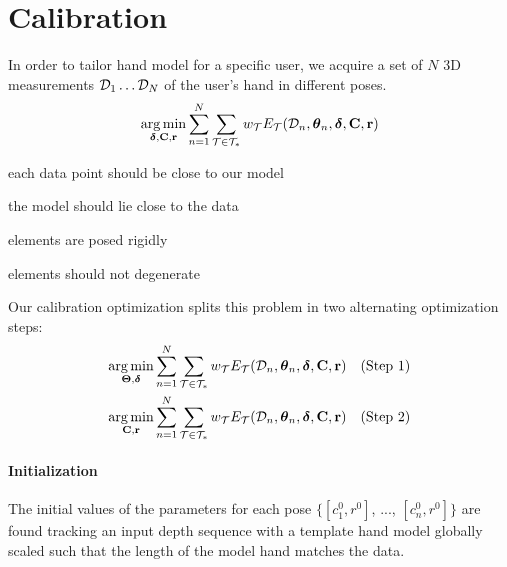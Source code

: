 \section{Calibration}
In order to tailor hand model for a specific user, we acquire a set of $N$ 3D measurements $\mathcal{D}_1 \dots \mathcal{D}_N$ of the user's hand in different poses.  
% 
% 
% 
\begin{eqnarray}
\operatorname*{arg\,min}_{\boldsymbol{\delta}, \mathbf{C}, \mathbf{r}}
\sum_{n=1}^N 
\sum_{\mathcal{T} \in \mathcal{T}_*} 
w_\mathcal{T} E_\mathcal{T}(\mathcal{D}_n, \boldsymbol{\theta}_n, \boldsymbol{\delta}, \mathbf{C}, \mathbf{r})
\end{eqnarray}
% 
\begin{description}[labelsep=0em,labelwidth=.4in,labelindent=1cm]
\item[d2m] each data point should be close to our model
\item[m2d] the model should lie close to the data
\item[rigid] elements are posed rigidly
\item[valid] elements should not degenerate
\end{description}
% 
Our calibration optimization splits this problem in two alternating optimization steps:
% 
\begin{eqnarray}
\operatorname*{arg\,min}_{\boldsymbol{\Theta}, \boldsymbol{\delta}} 
\sum_{n=1}^N 
\sum_{\mathcal{T} \in \mathcal{T}_*}
w_\mathcal{T} E_\mathcal{T}(\mathcal{D}_n, \boldsymbol{\theta}_n, \boldsymbol{\delta}, \mathbf{C}, \mathbf{r}) 
&& \text{(Step 1)}
\\
\operatorname*{arg\,min}_{\mathbf{C}, \mathbf{r}} 
\sum_{n=1}^N 
\sum_{\mathcal{T} \in \mathcal{T}_*}
w_\mathcal{T} E_\mathcal{T}(\mathcal{D}_n, \boldsymbol{\theta}_n, \boldsymbol{\delta}, \mathbf{C}, \mathbf{r})
&& \text{(Step 2)}
\end{eqnarray}

\paragraph{Initialization}
The initial values of the parameters for each pose  $\{[c^0_1 , r^0]$, ..., $[c^0_n, r^0]\}$ are found tracking an input depth sequence with a template hand model globally scaled such that the length of the model hand matches the data.




